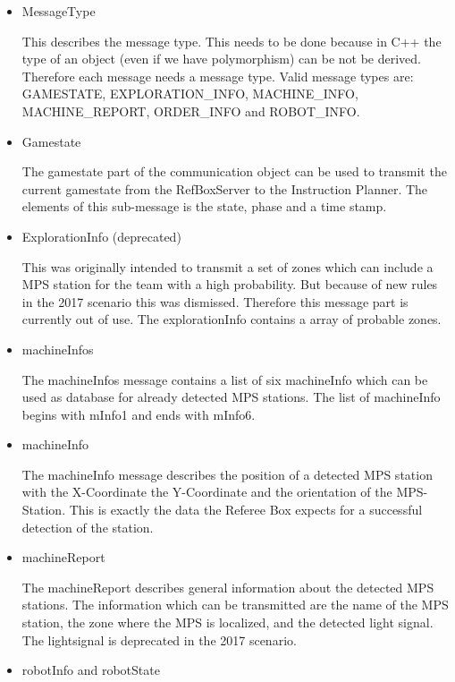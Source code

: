 \begin{itemize}

\item MessageType

This describes the message type. This needs to be done because in C++ the type of an object (even if we have polymorphism) can be not be derived. Therefore each message needs a message type. Valid message types are: GAMESTATE, EXPLORATION\_INFO, MACHINE\_INFO, MACHINE\_REPORT, ORDER\_INFO and 
ROBOT\_INFO. 

\item Gamestate

The gamestate part of the communication object can be used to transmit the current gamestate from the RefBoxServer to the Instruction Planner. The elements of this sub-message is the state, phase and a time stamp. 

\item ExplorationInfo (deprecated)

This was originally intended to transmit a set of zones which can include a MPS station for the team with a high probability. But because of new rules in the 2017 scenario this was dismissed. Therefore this message part is currently out of use. The explorationInfo contains a array of probable zones. 


\item machineInfos

The machineInfos message contains a list of six machineInfo which can be used as database for already detected MPS stations. The list of machineInfo begins with mInfo1 and ends with mInfo6.

\item machineInfo

The machineInfo message describes the position of a detected MPS station with the X-Coordinate the Y-Coordinate and the orientation of the MPS-Station. This is exactly the data the Referee Box expects for a successful detection of the station.


\item machineReport


The machineReport describes general information about the detected MPS stations. The information which can be transmitted are the name of the MPS station, the zone where the MPS is localized, and the detected light signal. The lightsignal is deprecated in the 2017 scenario. 

\item robotInfo and robotState


\end{itemize}
